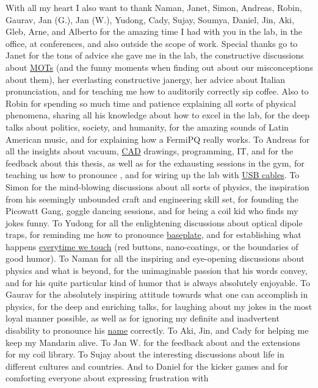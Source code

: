 \begin{minipage}{\textwidth}
With all my heart I also want to thank Naman, Janet, Simon, Andreas, Robin, Gaurav, Jan (G.), Jan (W.), Yudong, Cady, Sujay, Soumya, Daniel, Jin, Aki, Gleb, Arne, and Alberto for the amazing time I had with you in the lab, in the office, at conferences, and also outside the scope of work. Special thanks go to Janet for the tons of advice she gave me in the lab, the constructive discussions about \href{https://www.spencersmot.co.uk/wp-content/uploads/2021/08/AdobeStock_322578000-1024x819.jpeg}{MOTs} (and the funny moments when finding out about our misconceptions about them), her everlasting constructive janergy, her advice about Italian pronunciation, and for teaching me how to auditorily correctly sip coffee. Also to Robin for spending so much time and patience explaining all sorts of physical phenomena, sharing all his knowledge about how to excel in the lab, for the deep talks about politics, society, and humanity, for the amazing sounds of Latin American music, and for explaining how a FermiPQ really works. To Andreas for all the insights about vacuum, \href{https://i.imgur.com/mamNBfv.jpeg}{CAD} drawings, programming, IT, and for the feedback about this thesis, as well as for the exhausting sessions in the gym, for teaching us how to pronounce \href{https://www.youtube.com/watch?v=_3_JVVs2Kls}{\GaUsS}, and for wiring up the lab with \href{https://soundcloud.com/schatturus/usb-cable-1/s-Fyd3wafUQub?si=9655280d540d4f4b88e9b6aca0bb6602&utm_source=clipboard&utm_medium=text&utm_campaign=social_sharing}{USB cables}. To Simon for the mind-blowing discussions about all sorts of physics, the inspiration from his seemingly unbounded craft and engineering skill set, for founding the Picowatt Gang, goggle dancing sessions, and for being a coil kid who finds my jokes funny.  To Yudong for all the enlightening discussions about optical dipole traps, for reminding me how to pronounce \href{https://soundcloud.com/schatturus/baseplate/s-zBKCu5GdivC?si=674fdd5e94994e409cc93763e37c101e&utm_source=clipboard&utm_medium=text&utm_campaign=social_sharing}{baseplate}, and for establishing what happens \href{https://youtu.be/4G6QDNC4jPs?t=33}{everytime we touch} (red buttons, nano-coatings, or the boundaries of good humor). To Naman for all the inspiring and eye-opening discussions about physics and what is beyond, for the unimaginable passion that his words convey, and for his quite particular kind of humor that is always absolutely enjoyable. To Gaurav for the absolutely inspiring attitude towards what one can accomplish in physics, for the deep and enriching talks, for laughing about my jokes in the most loyal manner possible, as well as for ignoring my definite and inadvertent disability to pronounce his \href{https://upload.wikimedia.org/wikipedia/commons/c/c7/Rothschild%27s_Giraffe_%28Giraffa_camelopardalis_rothschildi%29_male_%287068054987%29%2C_crop_%26_edit.jpg}{name} correctly. To Aki, Jin, and Cady for helping me keep my Mandarin alive. To Jan W. for the feedback about and the extensions for my coil library. To Sujay about the interesting discussions about life in different cultures and countries. And to Daniel for the kicker games and for comforting everyone about expressing frustration with 
\end{minipage}
